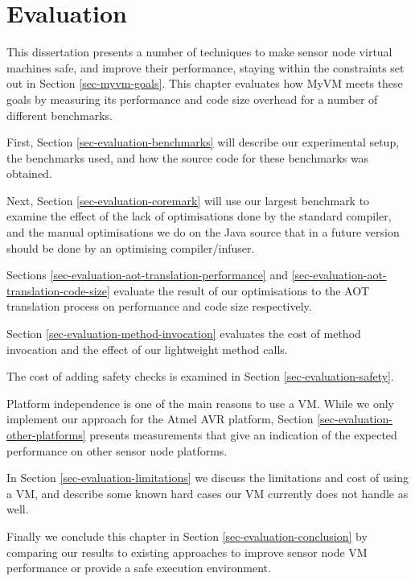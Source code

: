 \chapter{Evaluation}
\label{sec-evaluation}

This dissertation presents a number of techniques to make sensor node virtual machines safe, and improve their performance, staying within the constraints set out in Section \ref{sec-myvm-goals}. This chapter evaluates how MyVM meets these goals by measuring its performance and code size overhead for a number of different benchmarks.

First, Section \ref{sec-evaluation-benchmarks} will describe our experimental setup, the benchmarks used, and how the source code for these benchmarks was obtained.

Next, Section \ref{sec-evaluation-coremark} will use our largest benchmark to examine the effect of the lack of optimisations done by the standard  compiler, and the manual optimisations we do on the Java source that in a future version should be done by an optimising compiler/infuser.

Sections \ref{sec-evaluation-aot-translation-performance} and \ref{sec-evaluation-aot-translation-code-size} evaluate the result of our optimisations to the AOT translation process on performance and code size respectively.

Section \ref{sec-evaluation-method-invocation} evaluates the cost of method invocation and the effect of our lightweight method calls.

The cost of adding safety checks is examined in Section \ref{sec-evaluation-safety}.

Platform independence is one of the main reasons to use a VM. While we only implement our approach for the Atmel AVR platform, Section \ref{sec-evaluation-other-platforms} presents measurements that give an indication of the expected performance on other sensor node platforms.

In Section \ref{sec-evaluation-limitations} we discuss the limitations and cost of using a VM, and describe some known hard cases our VM currently does not handle as well.

Finally we conclude this chapter in Section \ref{sec-evaluation-conclusion} by comparing our results to existing approaches to improve sensor node VM performance or provide a safe execution environment.



